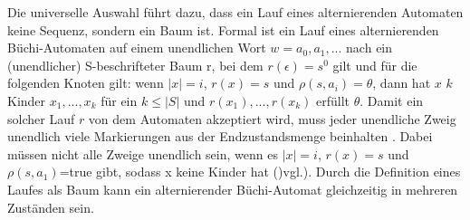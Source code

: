 Die universelle Auswahl führt dazu, dass ein Lauf eines alternierenden Automaten keine Sequenz, sondern ein Baum ist. Formal ist ein Lauf eines alternierenden Büchi-Automaten auf einem unendlichen Wort $w=a_0, a_1,...$ nach \cite{vardi+96} ein (unendlicher) S-beschrifteter Baum r, bei dem $r(\epsilon)=s^0$ gilt und für die folgenden Knoten gilt: wenn $|x|=i$, $r(x)=s$ und $\rho(s,a_i)=\theta$, dann hat $x$ $k$ Kinder $x_1,...,x_k$ für ein $k\leq|S|$ und ${r(x_1),...,r(x_k)}$ erfüllt $\theta$. Damit ein solcher Lauf $r$ von dem Automaten akzeptiert wird, muss jeder unendliche Zweig unendlich viele Markierungen aus der Endzustandsmenge beinhalten \cite{vardi+96}. Dabei müssen nicht alle Zweige unendlich sein, wenn es $|x|=i$, $r(x)=s$ und $\rho(s,a_1)$=true gibt, sodass x keine Kinder hat ()vgl.\cite{vardi+96}). Durch die Definition eines Laufes als Baum kann ein alternierender Büchi-Automat gleichzeitig in mehreren Zuständen sein. 

